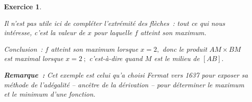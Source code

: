 \documentclass[10pt]{article}
\newtheorem{exo}{Exercice}
\begin{document}
\begin{exo}
\begin{enumerate}
\medskip

\setlength{\columnseprule}{1pt}

\begin{multicols}{2}

\begin{center}
\end{center}

\columnbreak

Il n'est pas utile ici de compléter l'extrémité des flèches~: tout ce qui nous intéresse, c'est la valeur de $x$ pour laquelle $f$ atteint son maximum.
\end{multicols}

Conclusion~: $f$ atteint son maximum lorsque $x=2,$ donc le produit $AM\times BM$ est maximal lorsque $x=2~;$ c'est-à-dire quand $M$ est le milieu de $\left[AB\right].$
\end{enumerate}

\medskip

\textbf{Remarque~:} Cet exemple est celui qu'a choisi Fermat vers 1637 pour exposer sa méthode de l'adégalité -- ancêtre de la dérivation -- pour déterminer le maximum et le minimum d'une fonction.
\end{exo}
\end{document}
